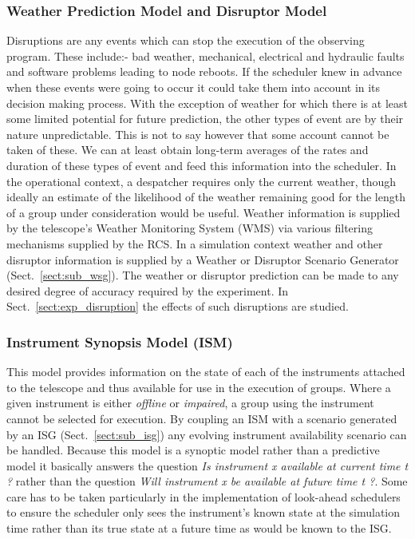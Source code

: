 \subsubsection{Weather Prediction Model and Disruptor Model}
Disruptions are any events which can stop the execution of the observing program. These include:- bad weather, mechanical, electrical and hydraulic faults and software problems leading to node reboots. If the scheduler knew in advance when these events were going to occur it could take them into account in its decision making process. With the exception of weather for which there is at least some limited potential for future prediction, the other types of event are by their nature unpredictable. This is not to say however that some account cannot be taken of these. We can at least obtain long-term averages of the rates and duration of these types of event and feed this information into the scheduler. In the operational context, a despatcher requires only the current weather, though ideally an estimate of the likelihood of the weather remaining good for the length of a group under consideration would be useful. Weather information is supplied by the telescope's Weather Monitoring System (WMS) via various filtering mechanisms supplied by the RCS. In a simulation context weather and other disruptor information is supplied by a Weather or Disruptor Scenario Generator (Sect.~\ref{sect:sub_wsg}). The weather or disruptor prediction can be made to any desired degree of accuracy required by the experiment. In Sect.~\ref{sect:exp_disruption} the effects of such disruptions are studied.


\subsubsection{Instrument Synopsis Model (ISM)}
This model provides information on the state of each of the instruments attached to the telescope and thus available for use in the execution of groups. Where a given instrument is either \emph{offline} or \emph{impaired}, a group using the instrument cannot be selected for execution. By coupling an ISM with a scenario generated by an ISG (Sect.~\ref{sect:sub_isg}) any evolving instrument availability scenario can be handled. Because this model is a synoptic model rather than a predictive model it basically answers the question \emph{Is instrument x available at current time t ?} rather than the question \emph{Will instrument x be available at future time t ?}. Some care has to be taken particularly in the implementation of look-ahead schedulers to ensure the scheduler only sees the instrument's known state at the simulation time rather than its true state at a future time as would be known to the ISG.

